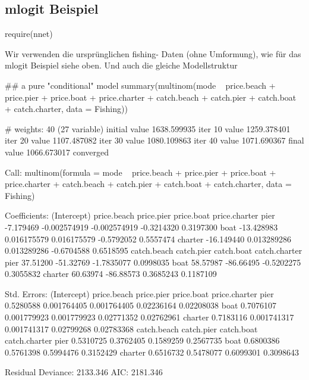 \documentclass[a4paper,twoside]{tufte-book}\usepackage[]{graphicx}\usepackage[]{color}
\begin{document}
\begin{appendices}
\subsection{mlogit Beispiel}

\begin{Schunk}
\begin{Sinput}
require(nnet)
\end{Sinput}
\end{Schunk}

Wir verwenden die ursprünglichen fishing- Daten (ohne Umformung), wie für das mlogit Beispiel siehe oben.
Und auch die gleiche Modellstruktur

\begin{Schunk}
\begin{Sinput}
## a pure "conditional" model
summary(multinom(mode ~ price.beach + price.pier + price.boat + price.charter + 
                   catch.beach + catch.pier + catch.boat + catch.charter, data = Fishing))
\end{Sinput}
\begin{Soutput}
# weights:  40 (27 variable)
initial  value 1638.599935 
iter  10 value 1259.378401
iter  20 value 1107.487082
iter  30 value 1080.109863
iter  40 value 1071.690367
final  value 1066.673017 
converged
\end{Soutput}
\begin{Soutput}
Call:
multinom(formula = mode ~ price.beach + price.pier + price.boat + 
    price.charter + catch.beach + catch.pier + catch.boat + catch.charter, 
    data = Fishing)

Coefficients:
        (Intercept)  price.beach   price.pier price.boat price.charter
pier      -7.179469 -0.002574919 -0.002574919 -0.3214320     0.3197300
boat     -13.428983  0.016175579  0.016175579 -0.5792052     0.5557474
charter  -16.149440  0.013289286  0.013289286 -0.6704588     0.6518595
        catch.beach catch.pier catch.boat catch.charter
pier       37.51200  -51.32769 -1.7835077     0.0998035
boat       58.57987  -86.66495 -0.5202275     0.3055832
charter    60.63974  -86.88573  0.3685243     0.1187109

Std. Errors:
        (Intercept) price.beach  price.pier price.boat price.charter
pier      0.5280588 0.001764405 0.001764405 0.02236164    0.02208038
boat      0.7076107 0.001779923 0.001779923 0.02771352    0.02762961
charter   0.7183116 0.001741317 0.001741317 0.02799268    0.02783368
        catch.beach catch.pier catch.boat catch.charter
pier      0.5310725  0.3762405  0.1589259     0.2567735
boat      0.6800386  0.5761398  0.5994476     0.3152429
charter   0.6516732  0.5478077  0.6099301     0.3098643

Residual Deviance: 2133.346 
AIC: 2181.346 
\end{Soutput}
\end{Schunk}
\end{appendices}


 
\end{document}
